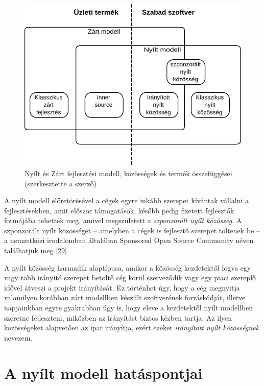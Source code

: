 \documentclass[12pt,magyar,a4paper,oneside]{scrreprt}
\begin{document}
\begin{figure}
\centering
\includegraphics{ábrák/nyílt-és-zárt-modell.pdf}
\caption{Nyílt és Zárt fejlesztési modell, közösségek és termék
összefüggései (szerkesztette a szerző)}
\end{figure}

A nyílt modell előretörésével a cégek egyre inkább szerepet kívántak
vállalni a fejlesztésekben, amit először támogatások, később pedig
fizetett fejlesztők formájába tehettek meg, amivel megszületett a
\emph{szponzorált nyílt közösség}. A szponzorált nyílt közösséget --
amelyben a cégek is fejlesztő szerepet töltenek be -- a nemzetközi
irodalomban általában Sponsored Open Source Community néven találhatjuk
meg {[}29{]}.

A nyílt közösség harmadik alaptípusa, amikor a közösség kezdetektől
fogva egy vagy több irányító szerepet betöltő cég körül szerveződik vagy
egy piaci szereplő idővel átveszi a projekt irányítását. Ez történhet
úgy, hogy a cég megnyitja valamilyen korábban zárt modellben készült
szoftverének forráskódját, illetve napjainkban egyre gyakrabban úgy is,
hogy eleve a kezdetektől nyílt modellben szeretne fejleszteni, miközben
az irányítást biztos kézben tartja. Az ilyen közösségeket alapvetően az
ipar irányítja, ezért ezeket \emph{irányított nyílt közösségnek}
nevezem.

\hypertarget{sec:FLOSSHP}{%
\section{A nyílt modell hatáspontjai}\label{sec:FLOSSHP}}
\end{document}

